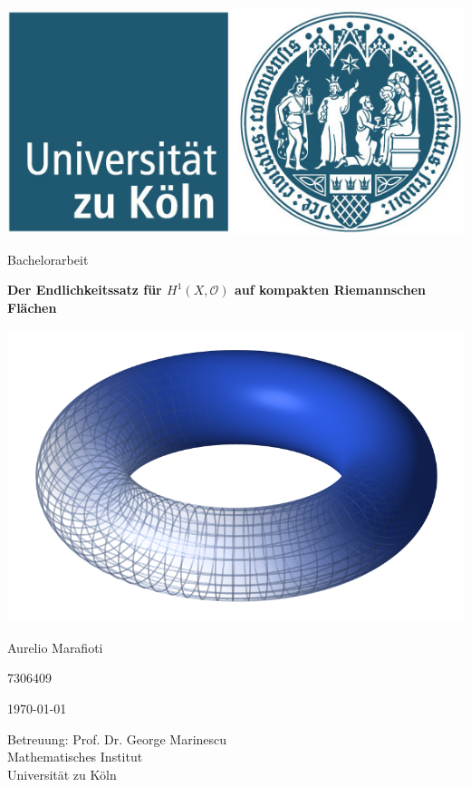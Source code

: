 \documentclass[10pt,a4paper]{article}
\begin{document}
	

		\begin{center} 
			\includegraphics[scale=0.4]{./Dateien/UniKoelnLogo.jpeg}
			\vspace*{2cm} 
			
			
			\large 
			Bachelorarbeit
			\vspace*{2cm}
			
			{\huge \textbf{Der Endlichkeitssatz für $H^1(X,\mathcal{O})$ auf kompakten Riemannschen Flächen}}
			\vspace*{1cm}
			
			\includegraphics[scale=0.2
			]{./Dateien/Torus.png}
			\vspace{2.5cm}
			
			Aurelio Marafioti
			
			7306409
			\vspace*{1cm}
			
			\today
			\vspace*{2cm}
			
			
			Betreuung: Prof. Dr. George Marinescu \\
			Mathematisches Institut \\
			Universität zu Köln
		\end{center}
\end{document}
